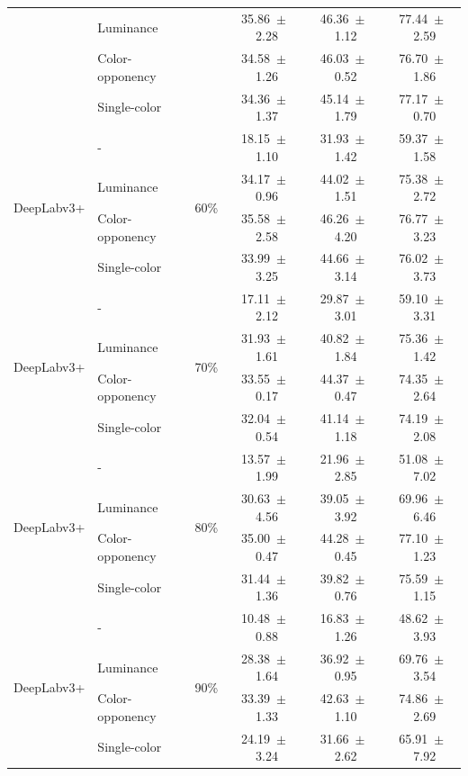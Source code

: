 \begin{table}[h]
\begin{tabular}{@{}l l c c c c@{}}
    & Luminance &  & 35.86~$\pm$~2.28 & 46.36~$\pm$~1.12 & 77.44~$\pm$~2.59 \\
    & Color-opponency &  & 34.58~$\pm$~1.26 & 46.03~$\pm$~0.52 & 76.70~$\pm$~1.86 \\
    & Single-color &  & 34.36~$\pm$~1.37 & 45.14~$\pm$~1.79 & 77.17~$\pm$~0.70 \\
    \midrule
    \multirow{4}{*}{DeepLabv3+} & - & \multirow{4}{*}{60\%} & 18.15~$\pm$~1.10 & 31.93~$\pm$~1.42 & 59.37~$\pm$~1.58 \\
    & Luminance &  & 34.17~$\pm$~0.96 & 44.02~$\pm$~1.51 & 75.38~$\pm$~2.72 \\
    & Color-opponency &  & 35.58~$\pm$~2.58 & 46.26~$\pm$~4.20 & 76.77~$\pm$~3.23 \\
    & Single-color &  & 33.99~$\pm$~3.25 & 44.66~$\pm$~3.14 & 76.02~$\pm$~3.73 \\
    \midrule
    \multirow{4}{*}{DeepLabv3+} & - & \multirow{4}{*}{70\%} & 17.11~$\pm$~2.12 & 29.87~$\pm$~3.01 & 59.10~$\pm$~3.31 \\
    & Luminance &  & 31.93~$\pm$~1.61 & 40.82~$\pm$~1.84 & 75.36~$\pm$~1.42 \\
    & Color-opponency &  & 33.55~$\pm$~0.17 & 44.37~$\pm$~0.47 & 74.35~$\pm$~2.64 \\
    & Single-color &  & 32.04~$\pm$~0.54 & 41.14~$\pm$~1.18 & 74.19~$\pm$~2.08 \\
    \midrule
    \multirow{4}{*}{DeepLabv3+} & - & \multirow{4}{*}{80\%} & 13.57~$\pm$~1.99 & 21.96~$\pm$~2.85 & 51.08~$\pm$~7.02 \\
    & Luminance &  & 30.63~$\pm$~4.56 & 39.05~$\pm$~3.92 & 69.96~$\pm$~6.46 \\
    & Color-opponency &  & 35.00~$\pm$~0.47 & 44.28~$\pm$~0.45 & 77.10~$\pm$~1.23 \\
    & Single-color &  & 31.44~$\pm$~1.36 & 39.82~$\pm$~0.76 & 75.59~$\pm$~1.15 \\
    \midrule
    \multirow{4}{*}{DeepLabv3+} & - & \multirow{4}{*}{90\%} & 10.48~$\pm$~0.88 & 16.83~$\pm$~1.26 & 48.62~$\pm$~3.93 \\
    & Luminance &  & 28.38~$\pm$~1.64 & 36.92~$\pm$~0.95 & 69.76~$\pm$~3.54 \\
    & Color-opponency &  & 33.39~$\pm$~1.33 & 42.63~$\pm$~1.10 & 74.86~$\pm$~2.69 \\
    & Single-color &  & 24.19~$\pm$~3.24 & 31.66~$\pm$~2.62 & 65.91~$\pm$~7.92 \\
    \midrule
    \bottomrule
  \end{tabular}
  \label{tab:deeplabv3plus_acdc_full}
\end{table}